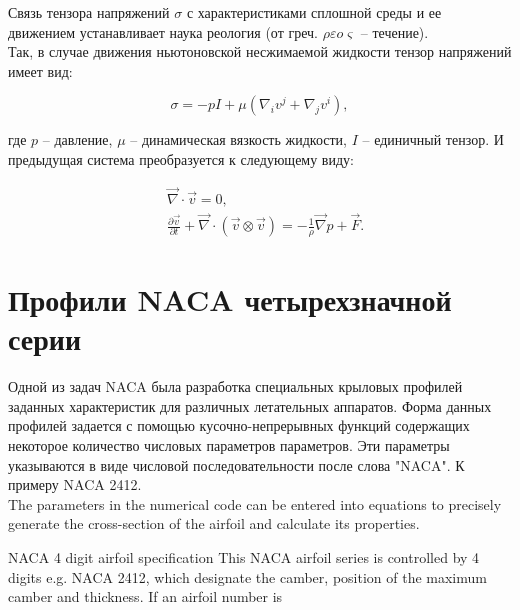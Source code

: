 \documentclass[12pt,a4paper]{article}
\begin{document}
    Связь тензора напряжений $\sigma$ с характеристиками сплошной среды и ее движением устанавливает наука реология (от греч. $\rho \varepsilon o \varsigma$ -- течение).\\

    Так, в случае движения ньютоновской несжимаемой жидкости тензор напряжений имеет вид:

    \begin{equation}
        \sigma = - p I + \mu \left( \nabla_{i} v^{j} + \nabla_{j} v^{i} \right),
        \label{eqn:Nmedia}
    \end{equation}

    \noindent где $p$ -- давление, $\mu$ -- динамическая вязкость жидкости, $I$ -- единичный тензор. И предыдущая система преобразуется к следующему виду:

    \begin{equation}
        \begin{split}
            &\vec{\nabla} \cdot \vec{v} = 0,\\
            &\frac{\partial \vec{v}}{\partial t} + \vec{\nabla} \cdot \left( \vec{v} \otimes \vec{v} \right) = - \frac{1}{\rho} \vec{\nabla} p + \vec{F}.
        \end{split}
        \label{eqn:NS}
    \end{equation}

    \section*{Профили NACA четырехзначной серии}

    Одной из задач NACA была разработка специальных крыловых профилей заданных характеристик для различных летательных аппаратов. Форма данных профилей задается с помощью кусочно-непрерывных функций содержащих некоторое количество числовых параметров параметров. Эти параметры указываются в виде числовой последовательности после слова "NACA". К примеру NACA 2412.\\

    The parameters in the numerical code can be entered into equations to precisely generate the cross-section of the airfoil and calculate its properties.
    
    NACA 4 digit airfoil specification
    This NACA airfoil series is controlled by 4 digits e.g. NACA 2412, which designate the camber, position of the maximum camber and thickness. If an airfoil number is
 
\end{document}
